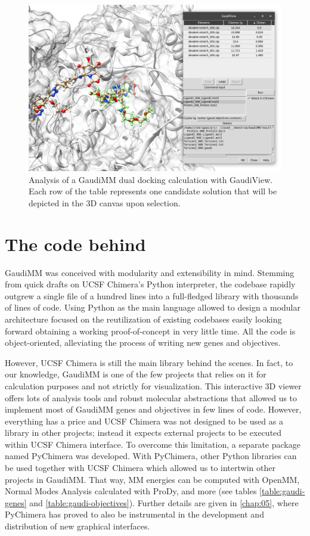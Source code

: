 \begin{figure}[H]
	\includegraphics[width=\textwidth]{./figures/04/gaudiview.png}
	\caption[GaudiView]{Analysis of a GaudiMM dual docking calculation with GaudiView. Each row of the table represents one candidate solution that will be depicted in the 3D canvas upon selection.}
	\label{fig:gaudiview}
\end{figure}


\section{The code behind}
GaudiMM was conceived with modularity and extensibility in mind. Stemming from quick drafts on UCSF Chimera's Python interpreter, the codebase rapidly outgrew a single file of a hundred lines into a full-fledged library with thousands of lines of code. Using Python as the main language allowed to design a modular architecture focused on the reutilization of existing codebases easily looking forward obtaining a working proof-of-concept in very little time. All the code is object-oriented, alleviating the process of writing new genes and objectives.

However, UCSF Chimera is still the main library behind the scenes. In fact, to our knowledge, GaudiMM is one of the few projects that relies on it for calculation purposes and not strictly for visualization. This interactive 3D viewer offers lots of analysis tools and robust molecular abstractions that allowed us to implement most of GaudiMM genes and objectives in few lines of code. However, everything has a price and UCSF Chimera was not designed to be used as a library in other projects; instead it expects external projects to be executed within UCSF Chimera interface. To overcome this limitation, a separate package named PyChimera was developed. With PyChimera, other Python libraries can be used together with UCSF Chimera which allowed us to intertwin other projects in GaudiMM. That way, MM energies can be computed with OpenMM, Normal Modes Analysis calculated with ProDy, and more (see tables \ref{table:gaudi-genes} and \ref{table:gaudi-objectives}). Further details are given in \autoref{chap:05}, where PyChimera has proved to also be instrumental in the development and distribution of new graphical interfaces.


